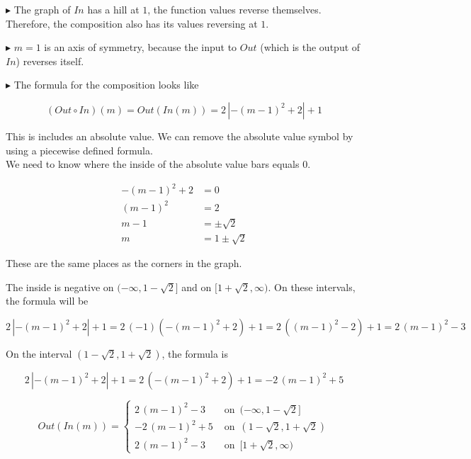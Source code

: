 \documentclass{ximera}
\begin{document}
$\blacktriangleright$ The graph of $In$ has a hill at $1$, the function values reverse themselves.  Therefore, the composition also has its values reversing at $1$.



$\blacktriangleright$ $m=1$ is an axis of symmetry, because the input to $Out$ (which is the output of $In$) reverses itself.




$\blacktriangleright$ The formula for the composition looks like


\[
(Out \circ In)(m) = Out(In(m))  = 2 \, |-(m-1)^2 + 2| + 1
\]

This is includes an absolute value.  We can remove the absolute value symbol by using a piecewise defined formula. \\


We need to know where the inside of the absolute value bars equals $0$.


\begin{align*}
-(m-1)^2 + 2   &= 0 \\
(m-1)^2        &= 2 \\
m-1            &= \pm \sqrt{2} \\
m              &= 1 \pm \sqrt{2} 
\end{align*}

These are the same places as the corners in the graph.


The inside is negative on $(-\infty, 1 - \sqrt{2}]$ and on $[1 + \sqrt{2}, \infty)$.  On these intervals, the formula will be 

\[
2 \, |-(m-1)^2 + 2| + 1 = 2 \, (-1)(-(m-1)^2 + 2) + 1 = 2 \, ((m-1)^2 - 2) + 1 = 2 \, (m-1)^2 - 3
\]


On the interval $(1 - \sqrt{2}, 1 + \sqrt{2})$, the formula is 


\[
2 \, |-(m-1)^2 + 2| + 1 = 2 \, (-(m-1)^2 + 2) + 1 =  -2 \, (m-1)^2 + 5
\]







\[
Out(In(m)) = 
\begin{cases}
  2 \, (m-1)^2 -3      &   \text{ on } \, (-\infty, 1 - \sqrt{2}]  \\
  -2 \, (m-1)^2 + 5    &   \text{ on } \, (1 - \sqrt{2}, 1 + \sqrt{2})   \\
  2 \, (m-1)^2 -3      &   \text{ on } \, [1 + \sqrt{2}, \infty)
\end{cases}
\]
\end{document}
